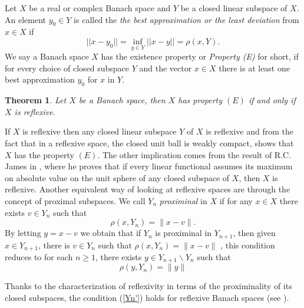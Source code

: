 \documentclass[12pt, reqno]{amsart}
\newtheorem{theorem}{Theorem}[section]
\theoremstyle{definition}
\theoremstyle{remark}
\numberwithin{equation}{section}
\begin{document}
Let $X$ be a real or complex Banach space and $Y$ be a closed linear subspace of $X$. An element $y_0\in Y$ is called the \textit{the best approximation or the least deviation} from $x\in X$ if $$||x-y_0||=\inf_{y\in Y} ||x-y||=\rho(x, Y).$$ 
We say a Banach space $X$ has the existence property or \textit{Property (E)} for short, if for every choice of closed subspace $Y$ and the vector $x\in X$ there is at least one best approximation $y_0$  for $x$ in $Y$. 
\begin{theorem}\cite{Hir}\label{Hir}
Let $X$ be a Banach space, then $X$ has property $(E)$ if and only if $X$ is reflexive.
\end{theorem}
If $X$ is reflexive then any closed linear subspace $Y$ of $X$ is reflexive and from the fact that  in a reflexive space, the  closed unit ball is weakly compact, shows that $X$ has the property $(E)$.  The other implication comes from the result of R.C. James in  \cite{RCJ}, where he proves that if every linear functional assumes its maximum on absolute value on the unit sphere of any closed subspace of $X$, then $X$ is reflexive.
Another  equivalent way of looking at reflexive spaces are through the concept of proximal subspaces.  We call  $Y_n$ \textit{proximinal} in $X$ if for any $x\in X$ there exists $v\in Y_n$ such that
 $$\rho(x, Y_n) =\|x-v\|.$$ By letting $y=x-v$ we obtain that if    $Y_n$ is  proximinal in  $Y_{n+1}$, then given $x\in Y_{n+1}$,  there is $v\in Y_n$ such that $\rho(x,Y_n)=\|x-v\|$ , this condition reduces to for each $n\ge1$, there exists $y\in Y_{n+1}\backslash Y_n$ such that
\begin{equation}
\label{Yn'}
\rho(y, Y_n)=\|y\|
\end{equation}

 Thanks to the characterization of reflexivity in terms of the proximinality of its closed subspaces, the condition (\ref{Yn'})  holds for reflexive Banach spaces (see \cite[Theorem $2.14$, p. $19$]{Singer2}). \\
 
\end{document}

